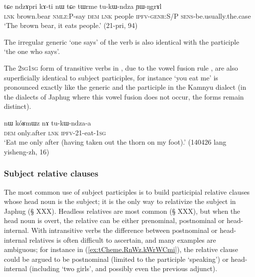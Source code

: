 \begin{exe}
\ex \label{ex:tukWndza.genr}
 \gll tɕe ndzɤpri kɤ-ti nɯ tɕe tɯrme tu-kɯ-ndza ɲɯ-ŋgrɤl  \\
 \textsc{lnk} brown.bear \textsc{nmlz}:P-say \textsc{dem} \textsc{lnk} people \textsc{ipfv}-\textsc{genr}:S/P \textsc{sens}-be.usually.the.case \\
\glt `The brown bear, it eats people.' (21-pri, 94)
\end{exe}
 
The irregular generic  `one says' of the verb  is also identical with the participle `the one who says'.

The \textsc{2sg}\fl{}\textsc{1sg} form of transitive verbs in , due to the vowel fusion rule  \fl{} , are also superficially identical to subject participles, for instance  `you eat me' is pronounced  exactly like the generic and the participle  in the Kamnyu dialect (in the dialects of Japhug where this vowel fusion does not occur, the forms remain distinct).

\begin{exe}
\ex \label{ex:tukWndzaa}
 \gll nɯ kóʁmɯz nɤ tu-kɯ-ndza-a \\
 \textsc{dem} only.after \textsc{lnk} \textsc{ipfv}-2\fl{}1-eat-\textsc{1sg} \\
 \glt `Eat me only after (having taken out the thorn on my foot).' (140426 lang yisheng-zh, 16)
\end{exe} 

\subsubsection{Subject relative clauses}  \label{ex:subject.participle.subject.relative}
The most common use of subject participles is to build participial relative clauses whose head noun is the subject; it is the only way to relativize the subject in Japhug (§ XXX). Headless relatives are most common (§ XXX), but when the head noun is overt, the relative can be either prenominal, postnominal or head-internal. With intransitive verbs the difference between postnominal or head-internal relatives is often difficult to ascertain, and many examples are ambiguous; for instance in (\ref{ex:tCheme.RnWz.kWrWCmi}), the relative clause could be argued to be postnominal (limited to the participle  `speaking') or head-internal (including  `two girls', and possibly even the previous adjunct).

